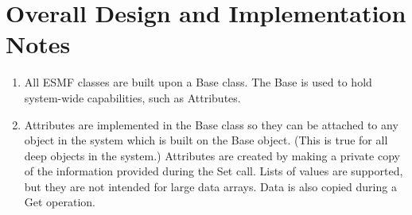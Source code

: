 
\section{Overall Design and Implementation Notes}

\begin{enumerate}

\item All ESMF classes are built upon a Base class.  The Base is used to hold 
system-wide capabilities, such as Attributes.

\item Attributes are implemented in the Base class so they can be attached to
any object in the system which is built on the Base object.  (This is true
for all deep objects in the system.)  Attributes are created by making a
private copy of the information provided during the Set call.  Lists of
values are supported, but they are not intended for large
data arrays.   Data is also copied during a Get operation.

\end{enumerate}
